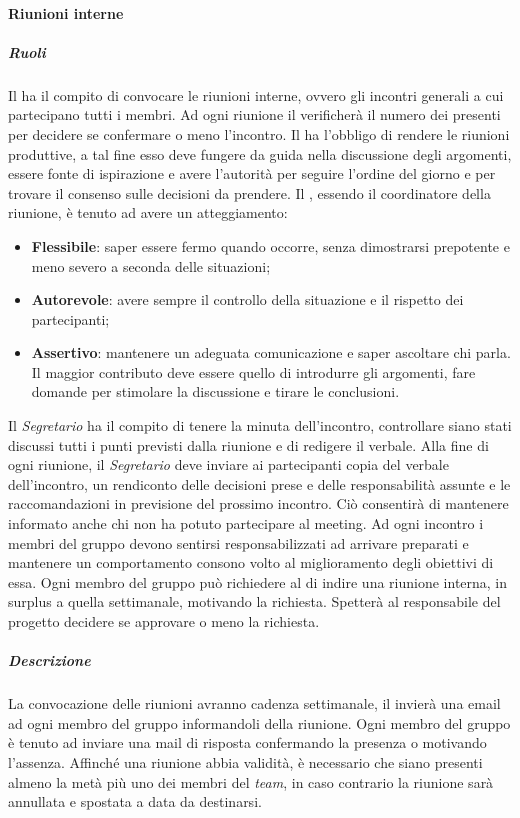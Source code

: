 \paragraph{Riunioni interne}
\subparagraph{Ruoli}
Il \textsl{\RdP} ha il compito di convocare le riunioni interne, ovvero gli incontri generali a cui partecipano tutti i membri.
Ad ogni riunione il \textsl{\RdP} verificherà il numero dei presenti per decidere se confermare o meno l'incontro.
Il \textsl{\RdP} ha l'obbligo di rendere le riunioni produttive, a tal fine 
esso deve fungere da guida nella discussione degli argomenti, essere fonte di ispirazione e avere l'autorità per seguire l'ordine del giorno e per trovare il consenso sulle decisioni da prendere.
Il \textsl{\RdP}, essendo il coordinatore della riunione, è tenuto ad avere un atteggiamento:
\begin{itemize}
\item
\textbf{Flessibile}: saper essere fermo quando occorre, senza dimostrarsi prepotente e meno severo a seconda delle situazioni;
\item
\textbf{Autorevole}: avere sempre il controllo della situazione e il rispetto dei partecipanti;
\item
\textbf{Assertivo}: mantenere un adeguata comunicazione e saper ascoltare chi parla. Il maggior contributo deve essere quello di introdurre gli argomenti, fare domande per stimolare la discussione e tirare le conclusioni.
\end{itemize}
Il \textit{Segretario} ha il compito di tenere la minuta dell'incontro, controllare siano stati discussi tutti i punti previsti dalla riunione e di redigere
il verbale. Alla fine di ogni riunione, il \textit{Segretario} deve inviare ai partecipanti copia del verbale dell'incontro, un rendiconto delle decisioni prese e delle responsabilità assunte e le raccomandazioni in previsione del prossimo incontro. Ciò consentirà di mantenere informato anche chi non ha potuto partecipare al meeting. 
Ad ogni incontro i membri del gruppo devono sentirsi responsabilizzati ad arrivare preparati e mantenere un comportamento consono volto al miglioramento degli obiettivi di essa.
Ogni membro del gruppo può richiedere al \textit{\RdP} di indire una riunione interna, in surplus a quella settimanale, motivando la richiesta. Spetterà al responsabile del progetto decidere se approvare o meno la richiesta.
\subparagraph{Descrizione}
La convocazione delle riunioni avranno cadenza settimanale, il \textit{\RdP} invierà una email ad ogni membro del gruppo informandoli della riunione.
Ogni membro del gruppo è tenuto ad inviare una mail di risposta confermando la presenza o motivando l'assenza.
Affinché una riunione abbia validità, è necessario che siano presenti almeno la metà più uno dei membri del \textit{team}, in caso contrario la riunione sarà annullata e spostata a data da destinarsi.

